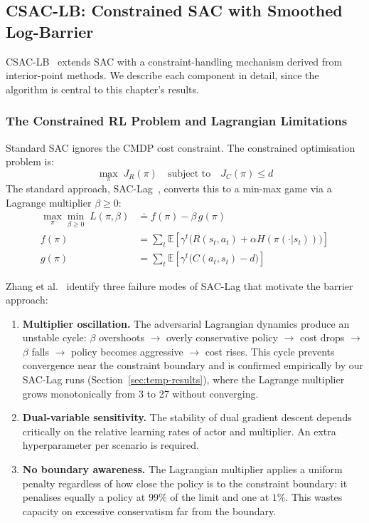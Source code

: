 \subsection{CSAC-LB: Constrained SAC with Smoothed Log-Barrier}
\label{sec:temp-csac}

CSAC-LB~\cite{zhang2024csaclb} extends SAC with a constraint-handling mechanism
derived from interior-point methods.  We describe each component in detail,
since the algorithm is central to this chapter's results.

\subsubsection{The Constrained RL Problem and Lagrangian Limitations}

Standard SAC ignores the CMDP cost constraint.  The constrained optimisation
problem is:
\begin{equation}
  \max_\pi\; J_R(\pi) \quad \text{subject to} \quad J_C(\pi) \leq d
  \label{eq:cmdp-problem}
\end{equation}
The standard approach, SAC-Lag~\cite{ha2020learning}, converts this to a
min-max game via a Lagrange multiplier $\beta \geq 0$:
\begin{align}
  \max_\pi \min_{\beta \geq 0}\;
    L(\pi, \beta) &\doteq f(\pi) - \beta\, g(\pi)
  \label{eq:sac-lag-objective} \\
  f(\pi) &= \sum_{t} \mathbb{E}\!\left[\gamma^t
    \bigl(R(s_t,a_t) + \alpha H(\pi(\cdot|s_t))\bigr)\right]
  \label{eq:reward-objective} \\
  g(\pi) &= \sum_{t} \mathbb{E}\!\left[\gamma^t
    \bigl(C(a_t,s_t) - d\bigr)\right]
  \label{eq:cost-constraint}
\end{align}

Zhang et al.~\cite{zhang2024csaclb} identify three failure modes of SAC-Lag
that motivate the barrier approach:
\begin{enumerate}
  \item \textbf{Multiplier oscillation.}  The adversarial Lagrangian dynamics
    produce an unstable cycle: $\beta$ overshoots $\to$ overly conservative
    policy $\to$ cost drops $\to$ $\beta$ falls $\to$ policy becomes aggressive
    $\to$ cost rises.  This cycle prevents convergence near the constraint
    boundary and is confirmed empirically by our SAC-Lag runs (Section~\ref{sec:temp-results}),
    where the Lagrange multiplier grows monotonically from 3 to 27 without
    converging.
  \item \textbf{Dual-variable sensitivity.}  The stability of dual gradient
    descent depends critically on the relative learning rates of actor and
    multiplier.  An extra hyperparameter per scenario is required.
  \item \textbf{No boundary awareness.}  The Lagrangian multiplier applies a
    uniform penalty regardless of how close the policy is to the constraint
    boundary: it penalises equally a policy at $99\%$ of the limit and one at
    $1\%$.  This wastes capacity on excessive conservatism far from the boundary.
\end{enumerate}

